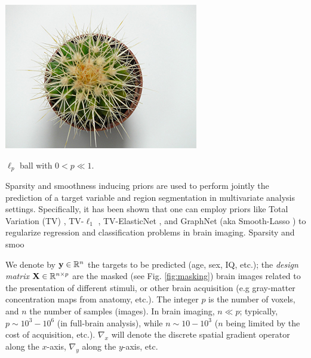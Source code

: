 \begin{marginfigure}[4cm]
  \centering
  \includegraphics[width=1\linewidth]{figures/ball.jpg}
  \caption{$\ell_p$ ball with $0 < p \ll 1$.}
  \label{fig:flower}
\end{marginfigure}

Sparsity and smoothness inducing priors are used to
perform jointly the prediction of a target variable and region
segmentation in multivariate analysis settings.
Specifically, it has been shown that one can employ priors like Total
Variation (TV)  \citep{michel2011tv}, TV-$\ell_1$
 \citep{baldassarre2012,gramfort2013}, TV-ElasticNet
 \citep{dubois2014predictive},
and GraphNet  \citep{grosenick2013}
(aka Smooth-Lasso  \citep{hebiri2011})
to regularize regression and classification
problems in brain imaging. Sparsity and smoo


We denote by ${\mathbf{y}} \in \mathbb{R}^{n}$ the targets to
be predicted (age, sex, IQ, etc.); the \textit{design matrix}
${\mathbf{X}}\in\mathbb{R}^{n \times p}$ are the masked (see Fig. \ref{fig:masking})
brain images related to the presentation of different
stimuli, or other brain acquisition (e.g gray-matter concentration
maps from anatomy, etc.). The integer $p$ is the number of voxels,
and $n$ the number of samples (images). In brain imaging, $n \ll p$;
typically, $p \sim 10^3-10^6$ (in full-brain analysis),
while $n \sim 10-10^3$ ($n$ being limited by the cost of acquisition,
etc.). $\nabla_x$ will denote the discrete spatial gradient operator
along the $x$-axis, $\nabla_y$ along the $y$-axis, etc.

